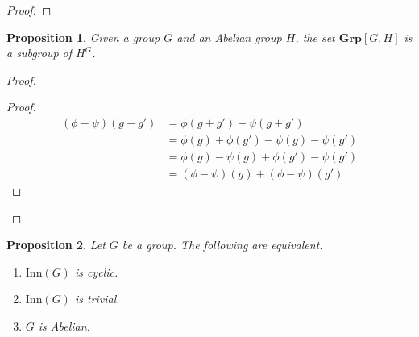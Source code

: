 \documentclass{book}
\let\qed\relax
\newtheorem{prop}{Proposition}[chapter]
\theoremstyle{definition}
\begin{document}
\begin{proof}
    \pf
    \qed
\end{proof}

\begin{prop}
    Given a group $G$ and an Abelian group $H$, the set $\mathbf{Grp}[G,H]$ is a subgroup of $H^G$.
\end{prop}

\begin{proof}
    \pf
    \begin{proof}
        \pf
        \begin{align*}
            (\phi - \psi)(g + g') & = \phi(g + g') - \psi(g + g')             \\
                                  & = \phi(g) + \phi(g') - \psi(g) - \psi(g') \\
                                  & = \phi(g) - \psi(g) + \phi(g') - \psi(g') \\
                                  & = (\phi - \psi)(g) + (\phi - \psi)(g')
        \end{align*}
    \end{proof}
    \qed
\end{proof}

\begin{prop}
Let $G$ be a group. The following are equivalent.
\begin{enumerate}
\item $\mathrm{Inn}(G)$ is cyclic.
\item $\mathrm{Inn}(G)$ is trivial.
\item $G$ is Abelian.
\end{enumerate}
\end{prop}
\end{document}
